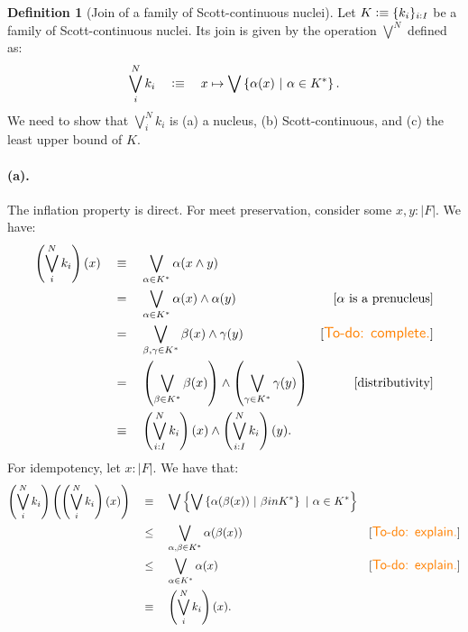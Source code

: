 \documentclass[a4paper, 11pt]{article}
\theoremstyle{definition}
\newtheorem{defn}{Definition}
\newcommand{\paren}[1]{\left( #1 \right)}
\newcommand{\setof}[1]{\left\{ #1 \right\}}
\newcommand{\is}{\vcentcolon\equiv}
\newcommand{\todo}[1]{{\large\color{orange}\textsf{To-do: #1.}}}
\begin{document}
\begin{defn}[Join of a family of Scott-continuous nuclei]
  Let $K \is \{ k_i \}_{i : I}$ be a family of Scott-continuous nuclei. Its join is given by
  the operation $\bigvee^N$ defined as:
  \begin{equation*}
    \bigvee^N_{i} k_i \quad\is\quad x \mapsto \bigvee \left\{ \alpha(x) ~|~ \alpha \in K^* \right\}.
  \end{equation*}
  We need to show that $\bigvee^N_{i} k_i$ is
    (a) a nucleus,
    (b) Scott-continuous, and
    (c) the least upper bound of $K$.

  \paragraph{(a).} The inflation property is direct. For meet preservation, consider some
  $x, y : | F |$. We have:
  \begin{align*}
         \left(\bigvee^N_{i} k_i\right)(x)
    &\quad\equiv\quad \bigvee_{\alpha \in K^*} \alpha(x \wedge y)                                                                   \\
    &\quad=\quad \bigvee_{\alpha \in K^*} \alpha(x) \wedge \alpha(y)                                & [\text{$\alpha$ is a prenucleus}]  \\
    &\quad=\quad \bigvee_{\beta, \gamma \in K^*} \beta(x) \wedge \gamma(y)                             & [\text{\todo{complete}}]      \\
    &\quad=\quad \paren{\bigvee_{\beta \in K^*} \beta(x)} \wedge \paren{\bigvee_{\gamma \in K^*} \gamma(y)}    & [\text{distributivity}]       \\
    &\quad\equiv\quad \paren{\bigvee^N_{i : I} k_i}(x) \wedge \paren{\bigvee^N_{i : I} k_i}(y).
  \end{align*}
  For idempotency, let $x : | F |$. We have that:
  \begin{align*}
    \left(\bigvee^N_{i} k_i\right)\left(\left(\bigvee^N_{i} k_i\right)(x)\right)
    &\quad\equiv\quad \bigvee \setof{ \bigvee \setof{ \alpha(\beta(x)) ~|~ \beta in K^* } ~|~ \alpha \in K^* } \\
    &\quad\le\quad \bigvee_{\alpha, \beta \in K^*} \alpha(\beta(x)) & [\text{\todo{explain}}]\\
    &\quad\le\quad \bigvee_{\alpha \in K^*} \alpha(x) & [\text{\todo{explain}}]\\
    &\quad\equiv\quad \paren{\bigvee^N_i k_i}(x).
  \end{align*}


\end{defn}
\end{document}
